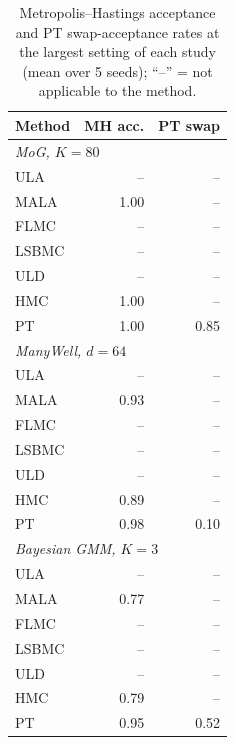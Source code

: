 \begin{table}[t]
\centering
\small
\caption{Metropolis--Hastings acceptance and PT swap-acceptance rates at the largest setting of each study (mean over 5 seeds); ``--'' = not applicable to the method.}
\label{tab:acceptance}
\begin{tabular}{lrr}
\toprule
Method & MH acc. & PT swap \\
\midrule
\multicolumn{3}{l}{\textit{MoG, $K=80$}}\\
ULA & -- & -- \\
MALA & 1.00 & -- \\
FLMC & -- & -- \\
LSBMC & -- & -- \\
ULD & -- & -- \\
HMC & 1.00 & -- \\
PT & 1.00 & 0.85 \\
\midrule
\multicolumn{3}{l}{\textit{ManyWell, $d=64$}}\\
ULA & -- & -- \\
MALA & 0.93 & -- \\
FLMC & -- & -- \\
LSBMC & -- & -- \\
ULD & -- & -- \\
HMC & 0.89 & -- \\
PT & 0.98 & 0.10 \\
\midrule
\multicolumn{3}{l}{\textit{Bayesian GMM, $K=3$}}\\
ULA & -- & -- \\
MALA & 0.77 & -- \\
FLMC & -- & -- \\
LSBMC & -- & -- \\
ULD & -- & -- \\
HMC & 0.79 & -- \\
PT & 0.95 & 0.52 \\
\bottomrule
\end{tabular}
\end{table}